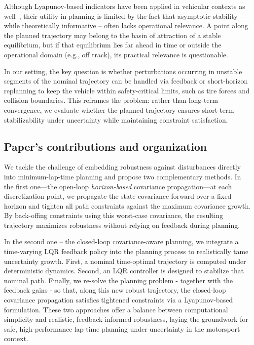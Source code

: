 Although Lyapunov-based indicators have been applied in vehicular contexts as well~\cite{Sadri:StabilityAnalysisNonlinear:2013,Meng:AnalysisGlobalCharacteristics:2022}, their utility in planning is limited by the fact that asymptotic stability -- while theoretically informative -- often lacks operational relevance. A point along the planned trajectory may belong to the basin of attraction of a stable equilibrium, but if that equilibrium lies far ahead in time or outside the operational domain (e.g., off track), its practical relevance is questionable.

In our setting, the key question is whether perturbations occurring in unstable segments of the nominal trajectory can be handled via feedback or short-horizon replanning to keep the vehicle within safety-critical limits, such as tire forces and collision boundaries. This reframes the problem: rather than long-term convergence, we evaluate whether the planned trajectory ensures short-term stabilizability under uncertainty while maintaining constraint satisfaction.



\subsection{Paper's contributions and organization}
We tackle the challenge of embedding robustness against disturbances directly into minimum-lap-time planning and propose two complementary methods. In the first one---the open-loop \emph{horizon-based} covariance propagation---at each discretization point, we propagate the state covariance forward over a fixed horizon and tighten all path constraints against the maximum covariance growth. By back-offing constraints using this worst-case covariance, the resulting trajectory maximizes robustness without relying on feedback during planning.

In the second one -- the closed-loop covariance-aware planning, we integrate a time-varying LQR feedback policy into the planning process to realistically tame uncertainty growth. First, a nominal time-optimal trajectory is computed under deterministic dynamics. Second, an LQR controller is designed to stabilize that nominal path. Finally, we re-solve the planning problem - together with the feedback gains - so that, along this new robust trajectory, the closed-loop covariance propagation satisfies tightened constraints via a Lyapunov-based formulation. These two approaches offer a balance between computational simplicity and realistic, feedback-informed robustness, laying the groundwork for safe, high-performance lap-time planning under uncertainty in the motorsport context.

